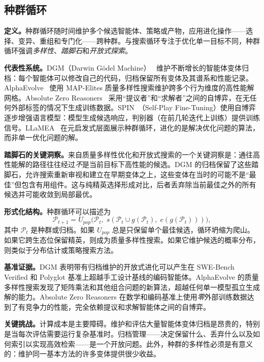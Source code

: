 \subsection{种群循环}\label{sec:ch2-population-loop}

\textbf{定义。}种群循环随时间维护多个候选智能体、策略或产物，应用进化操作——选择、变异、重组和专门化——跨种群。与搜索循环专注于优化单一目标不同，种群循环强调\emph{多样性}、\emph{踏脚石}和\emph{开放式探索}。

\textbf{代表性系统。}DGM（Darwin G\"{o}del Machine）~\cite{darwingodelmachine2025} 维护不断增长的智能体变体归档：每个智能体可以修改自己的代码，归档保留所有变体及其谱系和性能记录。AlphaEvolve~\cite{alphaevolve2025} 使用 MAP-Elites 质量多样性搜索维护跨多个行为维度的高性能解网格。Absolute Zero Reasoners~\cite{absolutezero2025} 采用``提议者''和``求解者''之间的自博弈，在无任何外部标签的情况下生成训练数据。SPIN~\cite{spin2024}（Self-Play Fine-Tuning）使用自博弈逐步增强语言模型：模型生成候选响应，判别器（在前几轮迭代上训练）提供训练信号。LLaMEA~\cite{llamea2024} 在元启发式层面展示种群循环，进化的是解决优化问题的算法，而非单一优化问题的解。

\textbf{踏脚石的关键洞察。}来自质量多样性优化和开放式搜索的一个关键洞察是：通往高性能解的路径往往经过\emph{不}是当前目标下高性能的候选。DGM 的归档保留了这些踏脚石，允许搜索重新审视和建立在早期变体之上，这些变体在当时的可能不是``最佳''但包含有用组件。这与纯精英选择形成对比，后者丢弃除当前最佳之外的所有候选并可能收敛到局部最优。

\textbf{形式化结构。}种群循环可以描述为
\begin{equation}\label{eq:ch2-population-update}
  \mathcal{P}_{t+1} = U_{pop}\bigl(\mathcal{P}_t,\; s(\mathcal{P}_t \cup g(\mathcal{P}_t),\; e(g(\mathcal{P}_t)))\bigr),
\end{equation}
其中 $\mathcal{P}_t$ 是种群或归档。如果 $U_{pop}$ 总是只保留单个最佳候选，循环坍缩为爬山。如果它跨生态位保留精英，则成为质量多样性搜索。如果它维护候选的概率分布，则类似于分布估计或策略搜索方法。

\textbf{基准证据。}DGM 表明带有归档维护的开放式进化可以产生在 SWE-Bench Verified 和 Polyglot 基准上超越手工设计基线的编码智能体。AlphaEvolve 的质量多样性搜索发现了矩阵乘法和其他组合问题的新算法，超越任何单一模型孤立生成解的能力。Absolute Zero Reasoners 在数学和编码基准上使用\emph{零}外部训练数据达到了有竞争力的性能，完全依赖提议和求解智能体之间的自博弈。

\textbf{关键挑战。}计算成本是主要障碍。维护和评估大量智能体变体归档是昂贵的，特别是当每次评估需要运行复杂基准时。归档管理——决定保留什么、丢弃什么以及如何索引以实现高效检索——是一个开放问题。此外，种群的多样性必须是有意义的：维护同一基本方法的许多变体提供很少收益。

